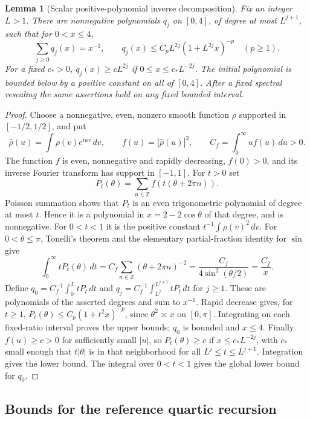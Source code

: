 \documentclass[11pt]{article}
\newtheorem{lemma}[proposition]{Lemma}
\begin{document}
\begin{lemma}[Scalar positive-polynomial inverse decomposition]
\label{complete:scalar-polynomials}
Fix an integer \(L>1\). There are nonnegative polynomials \(q_j\)
on \([0,4]\), of degree at most \(L^{j+1}\), such that for \(0<x\le4\),
\[
 \sum_{j\ge0}q_j(x)=x^{-1},\qquad
 q_j(x)\le C_pL^{2j}(1+L^{2j}x)^{-p}\quad(p\ge1).
\]
For a fixed \(c_*>0\),
\(q_j(x)\ge cL^{2j}\) if \(0\le x\le c_*L^{-2j}\).
The initial polynomial is bounded below by a positive constant on
all of \([0,4]\). After a fixed spectral rescaling the same assertions
hold on any fixed bounded interval.
\end{lemma}
\begin{proof}
Choose a nonnegative, even, nonzero smooth function \(\rho\) supported
in \([-1/2,1/2]\), and put
\[
 \widehat\rho(u)=\int\rho(v)e^{iuv}\,dv,\qquad
 f(u)=|\widehat\rho(u)|^2,\qquad
 C_f=\int_0^\infty u f(u)\,du>0.
\]
The function \(f\) is even, nonnegative and rapidly decreasing,
\(f(0)>0\), and its inverse Fourier transform has support
in \([-1,1]\). For \(t>0\) set
\[
 P_t(\theta)=\sum_{n\in\mathbb Z}f(t(\theta+2\pi n)).
\]
Poisson summation shows that \(P_t\) is an even trigonometric
polynomial of degree at most \(t\). Hence it is a polynomial in
\(x=2-2\cos\theta\) of that degree, and is nonnegative. For
\(0<t<1\) it is the positive constant
\(t^{-1}\int\rho(v)^2\,dv\). For \(0<\theta\le\pi\), Tonelli's
theorem and the elementary partial-fraction identity for \(\sin\)
give
\[
 \int_0^\infty tP_t(\theta)\,dt
 = C_f\sum_{n\in\mathbb Z}(\theta+2\pi n)^{-2}
 =\frac{C_f}{4\sin^2(\theta/2)}=\frac{C_f}{x}.
\]
Define \(q_0=C_f^{-1}\int_0^L tP_t\,dt\) and
\(q_j=C_f^{-1}\int_{L^j}^{L^{j+1}}tP_t\,dt\) for \(j\ge1\).
These are polynomials of the asserted degrees and sum to \(x^{-1}\).
Rapid decrease gives, for \(t\ge1\),
\(P_t(\theta)\le C_p(1+t^2x)^{-p}\), since
\(\theta^2\asymp x\) on \([0,\pi]\). Integrating on each
fixed-ratio interval proves the upper bounds; \(q_0\) is bounded
and \(x\le4\). Finally \(f(u)\ge c>0\) for sufficiently small
\(|u|\), so \(P_t(\theta)\ge c\) if
\(x\le c_*L^{-2j}\), with \(c_*\) small enough that
\(t|\theta|\) is in that neighborhood for all
\(L^j\le t\le L^{j+1}\). Integration gives the lower bound.
The integral over \(0<t<1\) gives the global lower bound for \(q_0\).
\end{proof}

\subsection{Bounds for the reference quartic recursion}
\end{document}
